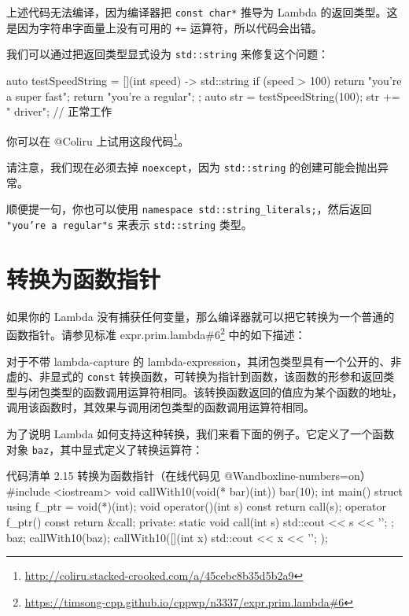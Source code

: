 \begin{codebox}
上述代码无法编译，因为编译器把 \texttt{const char*} 推导为 Lambda 的返回类型。这是因为字符串字面量上没有可用的 \texttt{+=} 运算符，所以代码会出错。

我们可以通过把返回类型显式设为 \texttt{std::string} 来修复这个问题：

\begin{codebox}
auto testSpeedString = [](int speed) -> std::string {
if (speed > 100)
return "you're a super fast";
return "you're a regular";
};
auto str = testSpeedString(100);
str += " driver"; // 正常工作
\end{codebox}

你可以在 @Coliru 上试用这段代码\footnote{\url{http://coliru.stacked-crooked.com/a/45cebc8b35d5b2a9}}。

请注意，我们现在必须去掉 \texttt{noexcept}，因为 \texttt{std::string} 的创建可能会抛出异常。

顺便提一句，你也可以使用 \texttt{namespace std::string\_literals;}，然后返回 \texttt{"you're a regular"s} 来表示 \texttt{std::string} 类型。

\section{转换为函数指针}

如果你的 Lambda 没有捕获任何变量，那么编译器就可以把它转换为一个普通的函数指针。请参见标准 expr.prim.lambda\#6\footnote{\url{https://timsong-cpp.github.io/cppwp/n3337/expr.prim.lambda\#6}} 中的如下描述：

对于不带 lambda-capture 的 lambda-expression，其闭包类型具有一个公开的、非虚的、非显式的 \texttt{const} 转换函数，可转换为指针到函数，该函数的形参和返回类型与闭包类型的函数调用运算符相同。该转换函数返回的值应为某个函数的地址，调用该函数时，其效果与调用闭包类型的函数调用运算符相同。

为了说明 Lambda 如何支持这种转换，我们来看下面的例子。它定义了一个函数对象 \texttt{baz}，其中显式定义了转换运算符：

\begin{codeboxt}{代码清单 2.15 转换为函数指针（在线代码见 @Wandboxline-numbers=on）}
#include <iostream>
void callWith10(void(* bar)(int)) { bar(10); }
int main() {
struct {
using f_ptr = void(*)(int);
void operator()(int s) const { return call(s); }
operator f_ptr() const { return &call; }
private:
static void call(int s) { std::cout << s << '\n'; };
} baz;
callWith10(baz);
callWith10([](int x) { std::cout << x << '\n'; });
}
\end{codeboxt}


\end{codebox}
